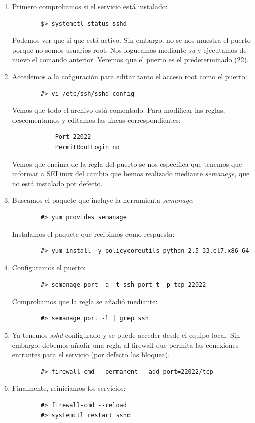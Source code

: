 \documentclass[12pt,spanish]{article}
\begin{document}
\begin{enumerate}
	\item Primero comprobamos si el servicio está instalado:
	\begin{lstlisting}
		$> systemctl status sshd
	\end{lstlisting}
	Podemos ver que sí que está activo. Sin embargo, no se nos muestra el puerto porque no somos usuarios root. Nos logueamos mediante \textit{su} y ejecutamos de nuevo el comando anterior. Veremos que el puerto es el predeterminado (22).
	\item Accedemos a la cofiguración para editar tanto el acceso root como el puerto:
	\begin{lstlisting}
		#> vi /etc/ssh/sshd_config
	\end{lstlisting}
	Vemos que todo el archivo está comentado. Para modificar las reglas, descomentamos y editamos las líneas correspondientes:
	\begin{lstlisting}
			Port 22022
			PermitRootLogin no
	\end{lstlisting}
	Vemos que encima de la regla del puerto se nos especifica que tenemos que informar a SELinux del cambio que hemos realizado mediante \textit{semanage}, que no está instalado por defecto.
	\item Buscamos el paquete que incluye la herramienta \textit{semanage}:
	\begin{lstlisting}
		#> yum provides semanage
	\end{lstlisting}
	Instalamos el paquete que recibimos como respuesta:
	\begin{lstlisting}
		#> yum install -y policycoreutils-python-2.5-33.el7.x86_64
	\end{lstlisting}
	\item Configuramos el puerto:
	\begin{lstlisting}
		#> semanage port -a -t ssh_port_t -p tcp 22022
	\end{lstlisting}
	Comprobamos que la regla se añadió mediante:
	\begin{lstlisting}
		#> semanage port -l | grep ssh
	\end{lstlisting}
	\item Ya tenemos \textit{sshd} configurado y se puede acceder desde el equipo local. Sin embargo, debemos añadir una regla al firewall que permita las conexiones entrantes para el servicio (por defecto las bloquea).
	\begin{lstlisting}
		#> firewall-cmd --permanent --add-port=22022/tcp
	\end{lstlisting}
	\item Finalmente, reiniciamos los servicios:
	\begin{lstlisting}
		#> firewall-cmd --reload
		#> systemctl restart sshd
	\end{lstlisting}
\end{enumerate}
\end{document}
